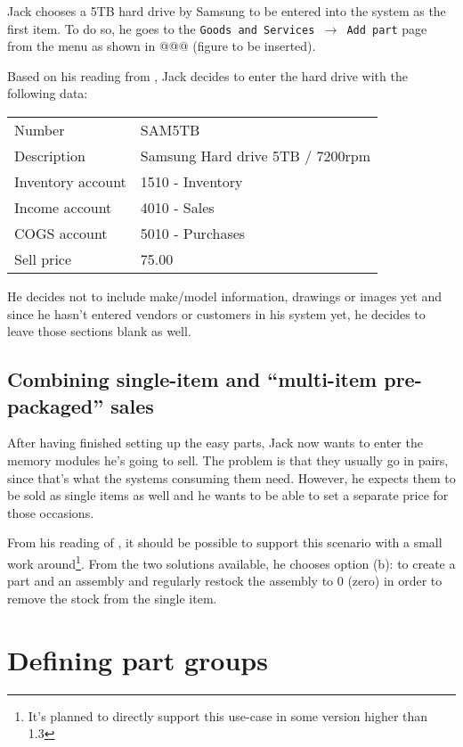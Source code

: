 Jack chooses a 5TB hard drive by Samsung to be entered into the system as the first item.
To do so, he goes to the {\tt Goods and Services $\rightarrow$ Add part} page from the menu
as shown in @@@ (figure to be inserted).

Based on his reading from , Jack decides to enter the hard
drive with the following data:

\begin{tabular}{ll}
Number & SAM5TB \\
Description & Samsung Hard drive 5TB / 7200rpm \\
Inventory account & 1510 - Inventory\\
Income account & 4010 - Sales\\
COGS account & 5010 - Purchases\\
Sell price & 75.00
\end{tabular}

He decides not to include make/model information, drawings or images yet and since
he hasn't entered vendors or customers in his system yet, he decides to leave
those sections blank as well.

\subsection{Combining single-item and ``multi-item pre-packaged'' sales}
\label{subsec-stock-parts-mulit-item}

After having finished setting up the easy parts, Jack now wants to enter
the memory modules he's going to sell. The problem is that they usually go in pairs,
since that's what the systems consuming them need. However, he expects them to be sold
as single items as well and he wants to be able to set a separate price for those occasions.

From his reading of , it should be
possible to support this scenario with a small work around\footnote{It's planned to directly
support this use-case in some version higher than 1.3}. From the two solutions available,
he chooses option (b): to create a part and an assembly and regularly restock the assembly
to 0 (zero) in order to remove the stock from the single item.

\section{Defining part groups}
\label{sec-stock-part-groups}

